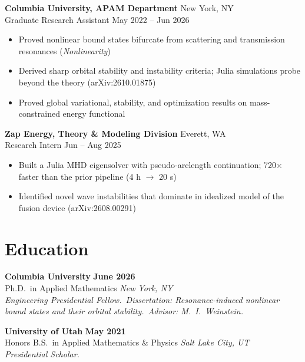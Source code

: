 \documentclass[10pt]{article}
\begin{document}
\textbf{Columbia University, APAM Department} \hfill New York, NY\\[1pt]
{\color{accent}Graduate Research Assistant} \hfill May 2022 -- Jun 2026
\begin{itemize}
\item Proved nonlinear bound states bifurcate from scattering and transmission resonances (\textit{Nonlinearity})
\item Derived sharp orbital stability and instability criteria; Julia simulations probe beyond the theory (arXiv:2610.01875)
\item Proved global variational, stability, and optimization results on mass-constrained energy functional
\end{itemize}

\vspace{2pt}
\textbf{Zap Energy, Theory \& Modeling Division} \hfill Everett, WA\\[1pt]
{\color{accent}Research Intern} \hfill Jun -- Aug 2025
\begin{itemize}
\item Built a Julia MHD eigensolver with pseudo-arclength continuation; 720$\times$ faster than the prior pipeline (4 h $\to$ 20 s)
\item Identified novel wave instabilities that dominate in idealized model of the fusion device (arXiv:2608.00291)
\end{itemize}

\vspace{2pt}
\section*{Education}

\textbf{Columbia University} \hfill \textbf{June 2026}\\
Ph.D.\ in Applied Mathematics \hfill \textit{New York, NY}\\
{\small \textit{Engineering Presidential Fellow.\ Dissertation: Resonance-induced nonlinear bound states and their orbital stability.\ Advisor: M.\ I.\ Weinstein.}}

\vspace{1pt}

\textbf{University of Utah} \hfill \textbf{May 2021}\\
Honors B.S.\ in Applied Mathematics \& Physics \hfill \textit{Salt Lake City, UT}\\
{\small \textit{Presidential Scholar.}}
\vspace{2pt}
\end{document}
